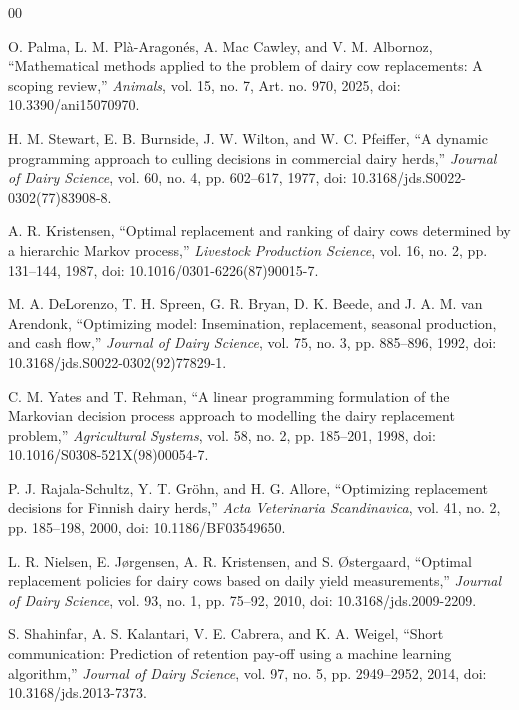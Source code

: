 \documentclass[conference]{IEEEtran}
\begin{document}
\renewcommand{\refname}{Kaynakça}
\begin{thebibliography}{00}

O. Palma, L. M. Plà-Aragonés, A. Mac Cawley, and V. M. Albornoz,
``Mathematical methods applied to the problem of dairy cow replacements: A
scoping review,'' \emph{Animals}, vol. 15, no. 7, Art. no. 970, 2025,
doi: 10.3390/ani15070970.

H. M. Stewart, E. B. Burnside, J. W. Wilton, and W. C. Pfeiffer, ``A dynamic
programming approach to culling decisions in commercial dairy herds,''
\emph{Journal of Dairy Science}, vol. 60, no. 4, pp. 602--617, 1977,
doi: 10.3168/jds.S0022-0302(77)83908-8.

A. R. Kristensen, ``Optimal replacement and ranking of dairy cows determined by
a hierarchic Markov process,'' \emph{Livestock Production Science}, vol. 16,
no. 2, pp. 131--144, 1987, doi: 10.1016/0301-6226(87)90015-7.

M. A. DeLorenzo, T. H. Spreen, G. R. Bryan, D. K. Beede, and J. A. M. van
Arendonk, ``Optimizing model: Insemination, replacement, seasonal production,
and cash flow,'' \emph{Journal of Dairy Science}, vol. 75, no. 3,
pp. 885--896, 1992, doi: 10.3168/jds.S0022-0302(92)77829-1.

C. M. Yates and T. Rehman, ``A linear programming formulation of the Markovian
decision process approach to modelling the dairy replacement problem,''
\emph{Agricultural Systems}, vol. 58, no. 2, pp. 185--201, 1998,
doi: 10.1016/S0308-521X(98)00054-7.

P. J. Rajala-Schultz, Y. T. Gröhn, and H. G. Allore, ``Optimizing replacement
decisions for Finnish dairy herds,'' \emph{Acta Veterinaria Scandinavica},
vol. 41, no. 2, pp. 185--198, 2000, doi: 10.1186/BF03549650.

L. R. Nielsen, E. Jørgensen, A. R. Kristensen, and S. Østergaard, ``Optimal
replacement policies for dairy cows based on daily yield measurements,''
\emph{Journal of Dairy Science}, vol. 93, no. 1, pp. 75--92, 2010,
doi: 10.3168/jds.2009-2209.

S. Shahinfar, A. S. Kalantari, V. E. Cabrera, and K. A. Weigel, ``Short
communication: Prediction of retention pay-off using a machine learning
algorithm,'' \emph{Journal of Dairy Science}, vol. 97, no. 5,
pp. 2949--2952, 2014, doi: 10.3168/jds.2013-7373.


\end{thebibliography}
\end{document}
